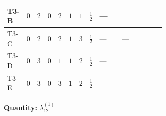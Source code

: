\documentclass[8pt]{article}
\begin{document}
\begin{landscape}
\begin{longtable}{@{}llcccccc >{\raggedright\arraybackslash}p{0.21\linewidth} >{\raggedright\arraybackslash}p{0.21\linewidth} >{\raggedright\arraybackslash}p{0.21\linewidth}@{}}
\midrule
T3-B & $0$ & $2$ & $0$ & $2$ & $1$ & $1$ & $\frac{1}{2}$ & --- & \scriptsize\adjustbox{max width=\linewidth}{$\begin{gathered} -2 \operatorname{Tr}\!\left({y_1}\,\left({y_1}\right)^{\dagger}\,{y_2}\,\left({y_2}\right)^{\dagger}\right)\end{gathered}$} & \scriptsize\adjustbox{max width=\linewidth}{$\begin{gathered} +3 {\lambda_5} \left({\lambda_5}\right)^{*}\end{gathered}$} \\
\midrule
T3-C & $0$ & $2$ & $0$ & $2$ & $1$ & $3$ & $\frac{1}{2}$ & --- & --- & \scriptsize\adjustbox{max width=\linewidth}{$\begin{gathered} +3 {\lambda_5} \left({\lambda_5}\right)^{*}\end{gathered}$} \\
\midrule
T3-D & $0$ & $3$ & $0$ & $1$ & $1$ & $2$ & $\frac{1}{2}$ & --- & \scriptsize\adjustbox{max width=\linewidth}{$\begin{gathered} -4 \operatorname{Tr}\!\left({y_1}\,\left({y_1}\right)^{\dagger}\,{y_2}\,\left({y_2}\right)^{\dagger}\right)\end{gathered}$} & \scriptsize\adjustbox{max width=\linewidth}{$\begin{gathered} +4 {\lambda_5} \left({\lambda_5}\right)^{*}\end{gathered}$} \\
\midrule
T3-E & $0$ & $3$ & $0$ & $3$ & $1$ & $2$ & $\frac{1}{2}$ & --- & \scriptsize\adjustbox{max width=\linewidth}{$\begin{gathered} -2 \operatorname{Tr}\!\left({y_1}\,\left({y_1}\right)^{\dagger}\,{y_2}\,\left({y_2}\right)^{\dagger}\right)\end{gathered}$} & --- \\
\midrule
\bottomrule
\end{longtable}
\clearpage
\noindent\textbf{Quantity: }$\lambda_{12}^{(1)}$\par\smallskip

\end{landscape}
\end{document}

